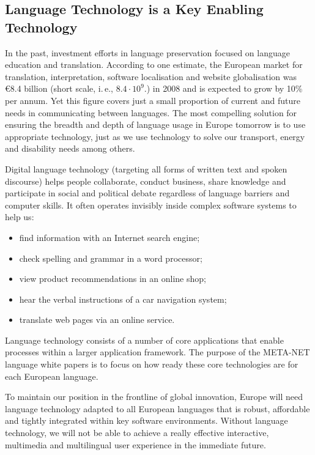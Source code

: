 \begin{multicols}{2}
\subsection{Language Technology is a Key Enabling Technology}
In the past, investment efforts in language preservation focused on language education and translation. According to one estimate, the European market for translation, interpretation, software localisation and website globalisation was €8.4 billion (short scale, i.\,e., $8.4\cdot 10^9$.) in 2008 and is expected to grow by 10\% per annum\cite{EC3}. Yet this figure covers just a small proportion of current and future needs in communicating between languages. The most compelling solution for ensuring the breadth and depth of language usage in Europe tomorrow is to use appropriate technology, just as we use technology to solve our transport, energy and disability needs among others.

Digital language technology (targeting all forms of written text and spoken discourse) helps people collaborate, conduct business, share knowledge and participate in social and political debate regardless of language barriers and computer skills. It often operates invisibly inside complex software systems to help us:

\begin{itemize}
\item find information with an Internet search engine;
\item check spelling and grammar in a word processor;
\item view product recommendations in an online shop;
\item hear the verbal instructions of a car navigation system;
\item translate web pages via an online service.
\end{itemize}

Language technology consists of a number of core applications that enable processes within a larger application framework. The purpose of the META-NET language white papers is to focus on how ready these core technologies are for each European language.

To maintain our position in the frontline of global innovation, Europe will need language technology adapted to all European languages that is robust, affordable and tightly integrated within key software environments. Without language technology, we will not be able to achieve a really effective interactive, multimedia and multilingual user experience in the immediate future. 


\end{multicols}
